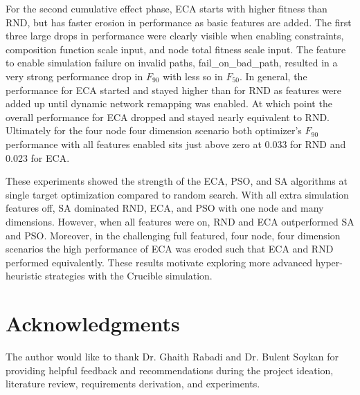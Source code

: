 \documentclass[a4paper]{article}
\begin{document}
For the second cumulative effect phase, ECA starts with higher fitness than RND, but has faster erosion in performance as basic features are added.  The first three large drops in performance were clearly visible when enabling constraints, composition function scale input, and node total fitness scale input. The feature to enable simulation failure on invalid paths, fail\_on\_bad\_path, resulted in a very strong performance drop in $F_{90}$ with less so in $F_{50}$. In general, the performance for ECA started and stayed higher than for RND as features were added up until dynamic network remapping was enabled. At which point the overall performance for ECA dropped and stayed nearly equivalent to RND. Ultimately for the four node four dimension scenario both optimizer's $F_{90}$ performance with all features enabled sits just above zero at 0.033 for RND and 0.023 for ECA.

These experiments showed the strength of the ECA, PSO, and SA algorithms at single target optimization compared to random search. With all extra simulation features off, SA dominated RND, ECA, and PSO with one node and many dimensions. However, when all features were on, RND and ECA outperformed SA and PSO. Moreover, in the challenging full featured, four node, four dimension scenarios the high performance of ECA was eroded such that ECA and RND performed equivalently. These results motivate exploring more advanced hyper-heuristic strategies with the Crucible simulation.

\section{Acknowledgments}

The author would like to thank Dr. Ghaith Rabadi and Dr. Bulent Soykan for providing helpful feedback and recommendations during the project ideation, literature review, requirements derivation, and experiments.



\end{document}
